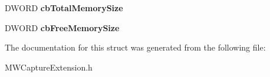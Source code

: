 \begin{DoxyCompactItemize}
\item 
\hypertarget{struct__MWCAP__PRO__CAPTURE__INFO_a37c503b8a8d69fc983a6cfa56c2ac579}{D\-W\-O\-R\-D {\bfseries cb\-Total\-Memory\-Size}}\label{struct__MWCAP__PRO__CAPTURE__INFO_a37c503b8a8d69fc983a6cfa56c2ac579}

\item 
\hypertarget{struct__MWCAP__PRO__CAPTURE__INFO_a122b3cd351f9d2671cf133707776081e}{D\-W\-O\-R\-D {\bfseries cb\-Free\-Memory\-Size}}\label{struct__MWCAP__PRO__CAPTURE__INFO_a122b3cd351f9d2671cf133707776081e}

\end{DoxyCompactItemize}


The documentation for this struct was generated from the following file\-:\begin{DoxyCompactItemize}
\item 
M\-W\-Capture\-Extension.\-h\end{DoxyCompactItemize}
